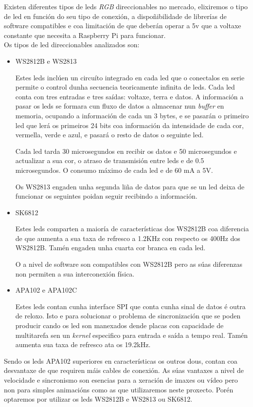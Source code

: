 Existen diferentes tipos de leds \emph{RGB} direccionables no mercado, elixiremos o tipo de led en función do seu tipo de conexión, a dispoñibilidade de librerías de software compatibles e coa limitación de que deberán operar a 5v que a voltaxe constante que necesita a Raspberry Pi para funcionar.\\

Os tipos de led direccionables analizados son:
\begin{itemize}
    \item WS2812B e WS2813

Estes leds inclúen un circuíto integrado en cada led que o conectalos en serie permite o control dunha secuencia teoricamente infinita de leds. Cada led conta con tres entradas e tres saídas: voltaxe, terra e datos. A información a pasar os leds se formara cun fluxo de datos a almacenar nun \emph{buffer} en memoria, ocupando a información de cada un 3 bytes, e se pasarán o primeiro led que lerá os primeiros 24 bits coa información da intensidade de cada cor, vermella, verde e azul, e pasará o resto de datos o seguinte led.

Cada led tarda 30 microsegundos en recibir os datos e 50 microsegundos e actualizar a sua cor, o atraso de transmisión entre leds e de 0.5 microsegundos. O consumo máximo de cada led e de 60 mA a 5V.

Os WS2813 engaden unha segunda liña de datos para que se un led deixa de funcionar os seguintes poidan seguir recibindo a información.
    \item SK6812

Estes leds comparten a maioría de características dos WS2812B coa diferencia de que aumenta a sua taxa de refresco a 1.2KHz con respecto os 400Hz dos WS2812B. Tamén engaden unha cuarta cor branca en cada led.

O a nivel de software son compatibles con WS2812B pero as súas diferenzas non permiten a sua interconexión física.
    \item APA102 e APA102C

Estes leds contan cunha interface SPI que conta cunha sinal de datos é outra de reloxo. Isto e para solucionar o problema de sincronización que se poden producir cando os led son manexados dende placas con capacidade de multitarefa sen un \emph{kernel} especifico para entrada e saída a tempo real. Tamén aumenta sua taxa de refresco ata os 19.2kHz.
\end{itemize}

Sendo os leds APA102 superiores en características os outros dous, contan coa desvantaxe de que requiren máis cables de conexión. As súas vantaxes a nivel de velocidade e sincronismo son esencias para a xeración de imaxes ou vídeo pero non para simples animacións como as que utilizaremos neste proxecto. Porén optaremos por utilizar os leds WS2812B e WS2813 ou SK6812.

